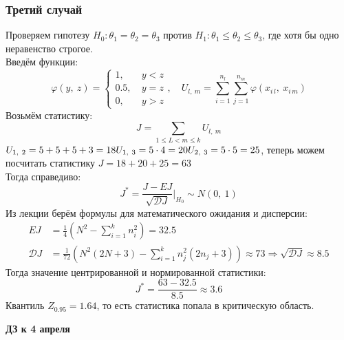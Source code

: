 \documentclass[12pt, a4paper]{article}
\newcommand{\dev}{\mathcal{D}}
\begin{document}
\subsubsection*{Третий случай}
Проверяем гипотезу $H_0: \theta_1 = \theta_2 = \theta_3$ против $H_1: \theta_1 \leq \theta_2 \leq \theta_3$, где хотя бы одно неравенство строгое.\\
Введём функции:
\[\varphi(y,\ z) = \begin{cases}
    1,\ & y < z\\
    0.5,\ & y = z\\
    0,\ & y > z
\end{cases},\quad U_{l,\ m} = \sum_{i = 1}^{n_l} \sum_{j = 1}^{n_m} \varphi(x_{i\, l},\ x_{i\, m})\]
Возьмём статистику:
\[J = \sum_{1 \leq L < m \leq k} U_{l,\ m}\]
$U_{1,\ 2} = 5 + 5 + 5 + 3 = 18\\
U_{1,\ 3} = 5\cdot 4 = 20\\
U_{2,\ 3} = 5\cdot 5 = 25$, теперь можем посчитать статистику $J = 18 + 20 + 25 = 63$\\
Тогда справедиво:
\[J^* = \frac{J - EJ}{\sqrt{\dev J}}\bigg|_{H_0} \sim N(0,\ 1)\]
Из лекции берём формулы для математического ожидания и дисперсии:
\begin{equation*}
    \begin{aligned}
        EJ &= \frac{1}{4} \left( N^2 - \sum_{i = 1}^{k} n_i^2 \right) = 32.5\\
        \dev J &= \frac{1}{72} \left( N^2 (2N + 3) - \sum_{i = 1}^{k} n_j^2 (2n_j + 3) \right) \approx 73 \Rightarrow \sqrt{\dev J} \approx 8.5
    \end{aligned}
\end{equation*}
Тогда значение центрированной и нормированной статистики:
\[J^* = \frac{63 - 32.5}{8.5} \approx 3.6\]
Квантиль $Z_{0.95} = 1.64$, то есть статистика попала в критическую область. 

\begin{center}
    \bf ДЗ к 4 апреля
\end{center}
\end{document}
